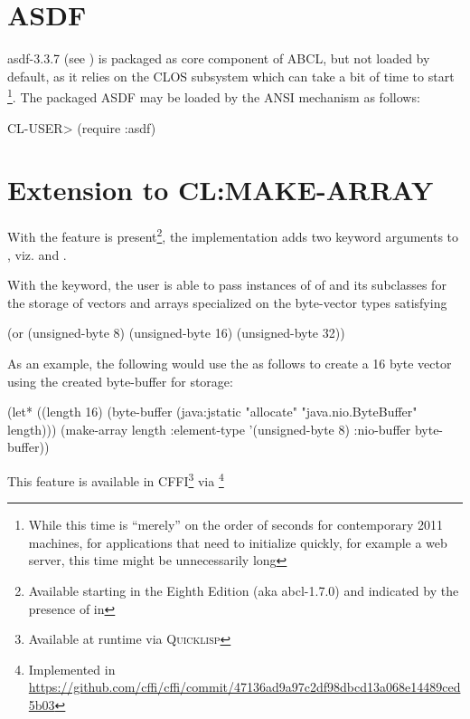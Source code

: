\documentclass[10pt]{book}
\begin{document}
\section{ASDF}

asdf-3.3.7 (see \cite{asdf}) is packaged as core component of
\textsc{ABCL}, but not loaded by default, as it relies on the
\textsc{CLOS} subsystem which can take a bit of time to
start \footnote{While this time is ``merely'' on the order of seconds
for contemporary 2011 machines, for applications that need to
initialize quickly, for example a web server, this time might be
unnecessarily long}.  The packaged \textsc{ASDF} may be loaded by the
\textsc{ANSI}  mechanism as follows:

\begin{listing-lisp}
CL-USER> (require :asdf)
\end{listing-lisp}

\section{Extension to CL:MAKE-ARRAY}
\label{section:make-array}

With the  feature is present\footnote{Available starting in
the Eighth Edition (aka abcl-1.7.0) and indicated by the presence of
 in }, the implementation adds two
keyword arguments to , viz.  and
.

With the  keyword, the user is able to pass
instances of of  and its subclasses for the
storage of vectors and arrays specialized on the byte-vector
types satisfying

\begin{listing-lisp}
  (or
    (unsigned-byte 8)
    (unsigned-byte 16)
    (unsigned-byte 32))
\end{listing-lisp}

As an example, the following would use the  as
follows to create a 16 byte vector using the created byte-buffer for
storage:

\begin{listing-lisp}
  (let* ((length 16)
         (byte-buffer (java:jstatic "allocate" "java.nio.ByteBuffer" length)))
    (make-array length :element-type '(unsigned-byte 8) :nio-buffer byte-buffer))
\end{listing-lisp}

This feature is available in CFFI\footnote{Available at runtime via
\textsc{Quicklisp}} via
\footnote{Implemented in
\url{https://github.com/cffi/cffi/commit/47136ad9a97c2df98dbcd13a068e14489ced5b03}}
\end{document}
